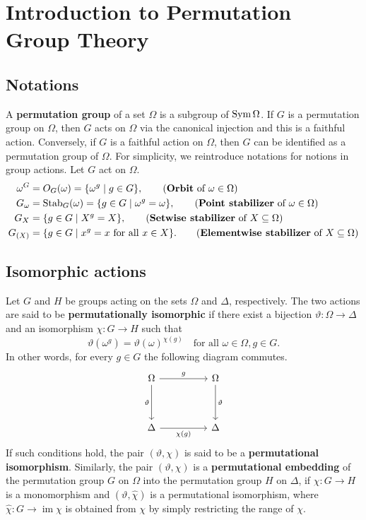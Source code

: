 \section{Introduction to Permutation Group Theory}
\subsection{Notations}
A \textbf{permutation group} of a set $\Omega$ is a subgroup of $\operatorname{Sym}\Omega$. If $G$ is a permutation group on $\Omega$, then $G$ acts on $\Omega$ via the canonical injection and this is a faithful action.  Conversely, if $G$ is a faithful action on $\Omega$, then $G$ can be identified as a permutation group of $\Omega$. For simplicity, we reintroduce notations for notions in group actions. Let $G$ act on $\Omega$.  
\begin{align*}
	\omega^G &= O_G(\omega) =\{\omega^g\mid g\in G\}, \tag{\textbf{Orbit} of $\omega \in \Omega$}
	\\
	G_{\omega} &= \operatorname{Stab}_G(\omega) = \{g\in G\mid \omega^g = \omega\}, \tag{\textbf{Point stabilizer} of $\omega\in \Omega$}
	\\
	G_{X} &=  \{g\in G\mid X^g = X\}, \tag{\textbf{Setwise stabilizer} of $X\subseteq \Omega$}
	\\
	G_{(X)} &=  \{g\in G\mid x^g = x\text{ for all }x\in X\}. \tag{\textbf{Elementwise stabilizer} of $X\subseteq \Omega$}
\end{align*}
\subsection{Isomorphic actions}
\begin{definition}
	Let $G$ and $H$ be groups acting on the sets $\Omega$ and $\Delta$, respectively. The two actions are said to be \textbf{permutationally isomorphic} if there exist a bijection $\vartheta: \Omega \to \Delta$ and an isomorphism $\chi: G \to H$ such that
	\[ \vartheta(\omega^g) = \vartheta(\omega)^{\chi(g)} \quad \text{for all } \omega \in \Omega, g \in G. \] In other words, for every $g\in G$ the following diagram commutes.
	\[\begin{tikzcd}
		\Omega && \Omega \\
		\\
		\Delta && \Delta
		\arrow["g", from=1-1, to=1-3]
		\arrow["\vartheta"', from=1-1, to=3-1]
		\arrow["\vartheta", from=1-3, to=3-3]
		\arrow["{\chi(g)}"', from=3-1, to=3-3]
	\end{tikzcd}\]
	If such conditions hold, the pair $(\vartheta, \chi)$ is said to be a \textbf{permutational isomorphism}. Similarly, the pair $(\vartheta, \chi)$ is a \textbf{permutational embedding} of the permutation group $G$ on $\Omega$ into the permutation group $H$ on $\Delta$, if $\chi: G \to H$ is a monomorphism and $(\vartheta, \hat{\chi})$ is a permutational isomorphism, where $\hat{\chi}: G \to \operatorname{im}\chi$ is obtained from $\chi$ by simply restricting the range of $\chi$.
\end{definition}


